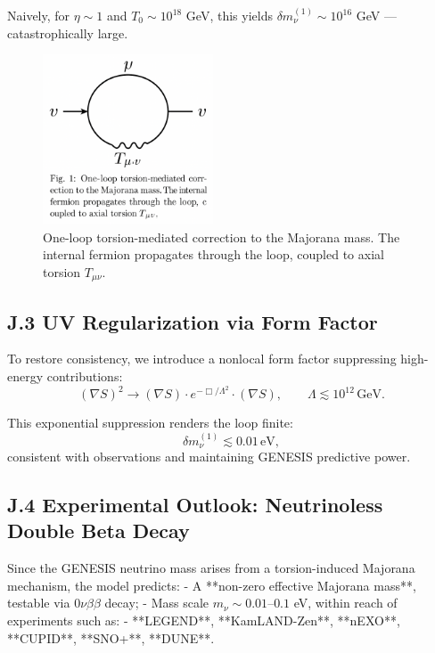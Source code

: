 \documentclass{article}
\begin{document}
Naively, for $\eta \sim 1$ and $T_0 \sim 10^{18}$ GeV, this yields $\delta m_\nu^{(1)} \sim 10^{16}$ GeV — catastrophically large.

\begin{figure}[h!]
\centering
\includegraphics[width=0.45\textwidth]{Fig.J.1.png}
\caption{One-loop torsion-mediated correction to the Majorana mass. The internal fermion propagates through the loop, coupled to axial torsion \( T_{\mu\nu} \).}
\label{fig:torsion_loop}
\end{figure}




\subsection*{J.3 UV Regularization via Form Factor}
To restore consistency, we introduce a nonlocal form factor suppressing high-energy contributions:
\begin{equation}
(\nabla S)^2 \rightarrow 
(\nabla S) \cdot e^{-\Box/\Lambda^2} \cdot (\nabla S),
\qquad \Lambda \lesssim 10^{12}\,\text{GeV}.
\end{equation}

This exponential suppression renders the loop finite:
\[
\delta m_\nu^{(1)} \lesssim 0.01\,\text{eV},
\]
consistent with observations and maintaining GENESIS predictive power.

\subsection*{J.4 Experimental Outlook: Neutrinoless Double Beta Decay}
Since the GENESIS neutrino mass arises from a torsion-induced Majorana mechanism, the model predicts:
- A **non-zero effective Majorana mass**, testable via $0\nu\beta\beta$ decay;
- Mass scale $m_\nu \sim 0.01$–$0.1$ eV, within reach of experiments such as:
  - **LEGEND**, **KamLAND-Zen**, **nEXO**, **CUPID**, **SNO+**, **DUNE**.
\end{document}
